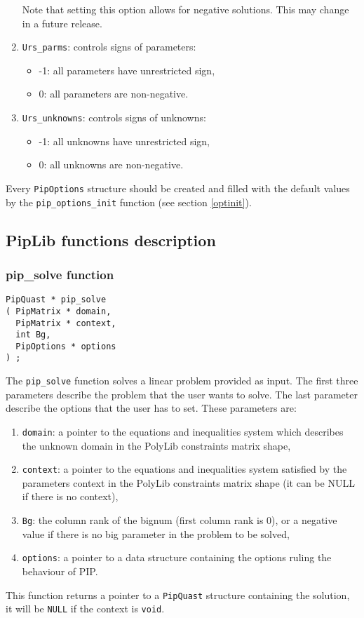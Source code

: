 \documentclass[12pt,a4paper,dvips]{article}
\begin{document}
\begin{enumerate}
      Note that setting this option allows for negative solutions.
      This may change in a future release.
\item \verb+Urs_parms+: controls signs of parameters:
	\begin{itemize}
	\item -1: all parameters have unrestricted sign,
	\item 0: all parameters are non-negative.
        \end{itemize}
\item \verb+Urs_unknowns+: controls signs of unknowns:
	\begin{itemize}
	\item -1: all unknowns have unrestricted sign,
	\item 0: all unknowns are non-negative.
        \end{itemize}
\end{enumerate}
Every {\tt PipOptions} structure should be created and filled with the default
values by the {\tt pip\_options\_init} function (see section \ref{optinit}).

\subsection{PipLib functions description}\label{PipLibfunc}
\subsubsection{pip\_solve function}
\begin{verbatim}
PipQuast * pip_solve
( PipMatrix * domain,
  PipMatrix * context,
  int Bg,
  PipOptions * options
) ;
\end{verbatim}
The {\tt pip\_solve} function solves a linear problem provided as input. The
first three parameters describe the problem that the user wants to solve.
The last parameter describe the options that the user has to set.
These parameters are:
\begin{enumerate}
\item {\tt domain}: a pointer to the equations and inequalities system which
      describes the unknown domain in the PolyLib constraints matrix shape,
\item {\tt context}: a pointer to the equations and inequalities system satisfied
      by the parameters context in the PolyLib constraints matrix shape
      (it can be NULL if there is no context),
\item {\tt Bg}: the column rank of the bignum (first column rank is 0), or a
      negative value if there is no big parameter in the problem to be solved, 
\item {\tt options}: a pointer to a data structure containing the options
      ruling the behaviour of PIP.
\end{enumerate}
This function returns a pointer to a {\tt PipQuast} structure containing the
solution, it will be {\tt NULL} if the context is {\tt void}.
\end{document}
